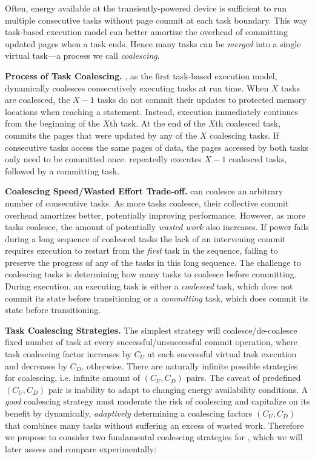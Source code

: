 Often, energy available at the transiently-powered device is sufficient to run multiple consecutive tasks without page commit at each task boundary. This way task-based execution model can better amortize the overhead of committing updated pages when a task ends. Hence many tasks can be \emph{merged} into a single virtual task---a process we call \emph{coalescing}. 

\textbf{Process of Task Coalescing.} \sys, as the first task-based execution model, dynamically coalesces consecutively executing tasks at run time. When $X$ tasks are coalesced, the $X-1$ tasks do not commit their updates to protected memory locations when reaching a \transition statement. Instead, execution immediately continues from the beginning of the $X$th task. At the end of the $X$th coalesced task, \sys commits the pages that were updated by any of the $X$ coalescing tasks. If consecutive tasks access the same pages of data, the pages accessed by both tasks only need to be committed once. \sys repeatedly executes $X-1$ coalesced tasks, followed by a committing task. 

\textbf{Coalescing Speed/Wasted Effort Trade-off.} \sys can coalesce an arbitrary number of consecutive tasks. As more tasks coalesce, their collective commit overhead amortizes better, potentially improving performance. However, as more tasks coalesce, the amount of potentially {\em wasted work} also increases. If power fails during a long sequence of coalesced tasks the lack of an intervening commit requires execution to restart from the {\em first} task in the sequence, failing to preserve the progress of any of the tasks in this long sequence. The challenge to coalescing tasks is determining how many tasks to coalesce before committing. During execution, an executing task is either a {\em coalesced} task, which does not commit its state before transitioning or a {\em committing} task, which does commit its state before transitioning.

\textbf{Task Coalescing Strategies.} The simplest strategy will coalesce/de-coalesce fixed number of task at every successful/unsuccessful commit operation, where task coalescing factor increases by $C_U$ at each successful virtual task execution and decreases by $C_D$, otherwise. There are naturally infinite possible strategies for coalescing, i.e. infinite amount of $(C_U,C_D)$ pairs. The caveat of predefined $(C_U,C_D)$ pair is inability to adapt to changing energy availability conditions. A \emph{good} coalescing strategy must moderate the risk of coalescing and capitalize on its benefit by dynamically, \emph{adaptively} determining a coalescing factors $(C_U,C_D)$ that combines many tasks without suffering an excess of wasted work. Therefore we propose to consider two fundamental coalescing strategies for \sys, which we will later assess and compare experimentally:

